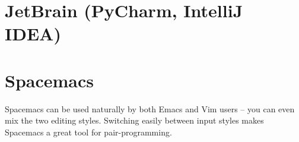 \section{JetBrain (PyCharm, IntelliJ IDEA)}
\label{sec:JetBrain}

\section{Spacemacs}
\label{sec:spacemacs}

Spacemacs can be used naturally by both Emacs and Vim users -- you can even mix
the two editing styles. Switching easily between input styles makes Spacemacs a
great tool for pair-programming.


